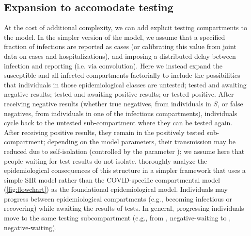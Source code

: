 \documentclass[12pt]{article}\usepackage[]{graphicx}\usepackage[]{color}
\begin{document}
\subsection*{Expansion to accomodate testing}

At the cost of additional complexity, we can add explicit testing compartments to the model.
In the simpler version of the model, we assume that a specified fraction of infections are reported as cases (or calibrating this value from joint data on cases and hospitalizations), and imposing a distributed delay between infection and reporting (i.e. via convolution).
Here we instead expand the susceptible and all infected compartments factorially to include the possibilities that individuals in those epidemiological classes are untested; tested and awaiting negative results; tested and awaiting positive results; or tested positive.
After receiving negative results (whether true negatives, from individuals in $S$, or false negatives, from individuals in one of the infectious compartments), individuals cycle back to the untested sub-compartment where they can be tested again. After receiving positive results, they remain in the positively tested sub-compartment; depending on the model parameters, their transmission may be reduced due to self-isolation (controlled by the parameter ); we assume here that people waiting for test results do not isolate.
\cite{Ghar+22} thoroughly analyze the epidemiological consequences of this structure in a simpler framework that uses a simple SIR model rather than the COVID-specific compartmental model (\cref{fig:flowchart}) as the foundational epidemiological model.
Individuals may progress between epidemiological compartments (e.g., becoming infectious or recovering) while awaiting the results of tests. In general, progressing individuals move to the same testing subcompartment (e.g., from , negative-waiting to , negative-waiting).
\end{document}
